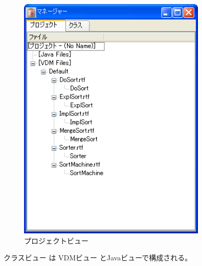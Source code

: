 \documentclass[\pformat,12pt]{jarticle}
\newcommand{\guicmd}[1]{{\gt #1}}
\begin{document}
\begin{figure}[tbh]
\begin{center}
\mbox{}
\includegraphics[width=9cm]{projectView-pp.png}
\caption{プロジェクトビュー}
\label{fig:projectView}
\end{center}
\end{figure}



\guicmd{クラスビュー} は \guicmd{VDMビュー} と\guicmd{Javaビュー}で構成される。
\end{document}
